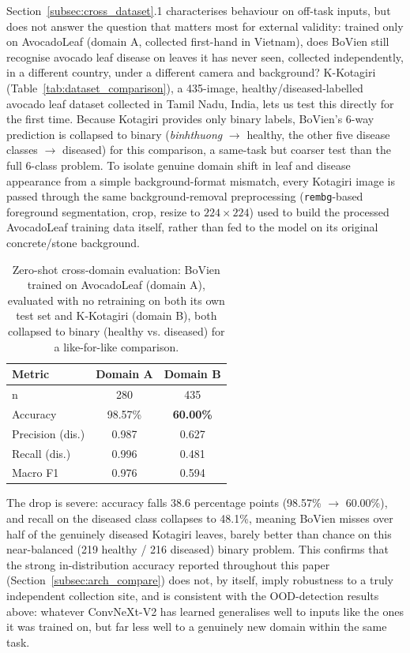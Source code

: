 Section~\ref{subsec:cross_dataset}.1 characterises behaviour on off-task inputs, but does not answer the question that matters most for external validity: trained only on AvocadoLeaf (domain A, collected first-hand in Vietnam), does BoVien still recognise avocado leaf disease on leaves it has never seen, collected independently, in a different country, under a different camera and background? K-Kotagiri \citeyearpar{kotagiri2024avocado} (Table~\ref{tab:dataset_comparison}), a 435-image, healthy/diseased-labelled avocado leaf dataset collected in Tamil Nadu, India, lets us test this directly for the first time. Because Kotagiri provides only binary labels, BoVien's 6-way prediction is collapsed to binary (\textit{binhthuong} $\to$ healthy, the other five disease classes $\to$ diseased) for this comparison, a same-task but coarser test than the full 6-class problem. To isolate genuine domain shift in leaf and disease appearance from a simple background-format mismatch, every Kotagiri image is passed through the same background-removal preprocessing (\texttt{rembg}-based foreground segmentation, crop, resize to $224\times224$) used to build the processed AvocadoLeaf training data itself, rather than fed to the model on its original concrete/stone background.

\begin{table}[htbp]
\centering
\caption{Zero-shot cross-domain evaluation: BoVien trained on AvocadoLeaf (domain A), evaluated with no retraining on both its own test set and K-Kotagiri (domain B), both collapsed to binary (healthy vs. diseased) for a like-for-like comparison.}
\label{tab:real_cross_domain}
\small
\begin{tabular}{lcc}
\toprule
\textbf{Metric} & \textbf{Domain A} & \textbf{Domain B} \\
\midrule
n                 & 280     & 435 \\
Accuracy          & 98.57\% & \textbf{60.00\%} \\
Precision (dis.)  & 0.987   & 0.627 \\
Recall (dis.)     & 0.996   & 0.481 \\
Macro F1          & 0.976   & 0.594 \\
\bottomrule
\end{tabular}
\end{table}

The drop is severe: accuracy falls 38.6 percentage points (98.57\% $\to$ 60.00\%), and recall on the diseased class collapses to 48.1\%, meaning BoVien misses over half of the genuinely diseased Kotagiri leaves, barely better than chance on this near-balanced (219 healthy / 216 diseased) binary problem. This confirms that the strong in-distribution accuracy reported throughout this paper (Section~\ref{subsec:arch_compare}) does not, by itself, imply robustness to a truly independent collection site, and is consistent with the OOD-detection results above: whatever ConvNeXt-V2 has learned generalises well to inputs like the ones it was trained on, but far less well to a genuinely new domain within the same task.

